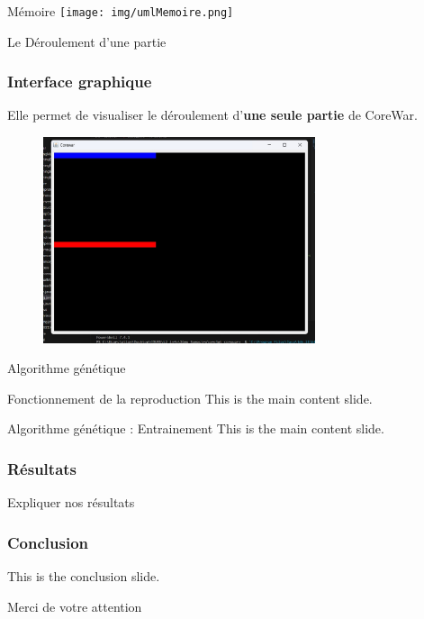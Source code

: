\documentclass{beamer}
\begin{document}
\begin{frame}{Mémoire}
    \texttt{[image: img/umlMemoire.png]}
\end{frame}

\begin{frame}{Le Déroulement d'une partie}
    
\end{frame}

\begin{frame}
    \frametitle{Interface graphique}
    Elle permet de visualiser le déroulement d'\textbf{une seule partie} de CoreWar.
    \begin{figure}
        \centering
        \includegraphics[width = 8cm]{img/display.jpg}
    \end{figure}
\end{frame}

\begin{frame}{Algorithme génétique}
    
\end{frame}

\begin{frame}{Fonctionnement de la reproduction}
    This is the main content slide.
\end{frame}

\begin{frame}{Algorithme génétique : Entrainement}
    This is the main content slide.
\end{frame}

\begin{frame}
    \frametitle{Résultats}
    Expliquer nos résultats
\end{frame}

\begin{frame}
    \frametitle{Conclusion}
    This is the conclusion slide.
\end{frame}

\begin{frame}{}
    \begin{center}
        \Huge Merci de votre attention
    \end{center}
\end{frame}
\end{document}

